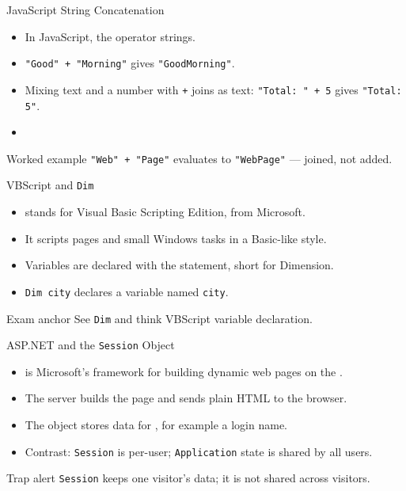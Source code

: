 \documentclass[aspectratio=169]{beamer}
\begin{document}
\begin{frame}{JavaScript String Concatenation}
  \begin{itemize}
    \item In JavaScript, the \key{\texttt{+}} operator 
      strings.
    \item \texttt{"Good" + "Morning"} gives \texttt{"GoodMorning"}.
    \item Mixing text and a number with \texttt{+} joins as text:
      \texttt{"Total: " + 5} gives \texttt{"Total: 5"}.
    \item {}
  \end{itemize}
  \begin{exampleblock}{Worked example}
    \texttt{"Web" + "Page"} evaluates to \texttt{"WebPage"} --- joined, not added.
  \end{exampleblock}
\end{frame}

\begin{frame}{VBScript and \texttt{Dim}}
  \begin{itemize}
    \item {} stands for Visual Basic Scripting Edition, from Microsoft.
    \item It scripts pages and small Windows tasks in a Basic-like style.
    \item Variables are declared with the  statement, short
      for Dimension.
    \item \texttt{Dim city} declares a variable named \texttt{city}.
  \end{itemize}
  \begin{block}{Exam anchor}
    See \texttt{Dim} and think VBScript variable declaration.
  \end{block}
\end{frame}

\begin{frame}{ASP.NET and the \texttt{Session} Object}
  \begin{itemize}
    \item {} is Microsoft's framework for building dynamic web pages
      on the .
    \item The server builds the page and sends plain HTML to the browser.
    \item The  object stores data for , for example a login name.
    \item Contrast: \texttt{Session} is per-user; \texttt{Application} state
      is shared by all users.
  \end{itemize}
  \begin{alertblock}{Trap alert}
    \texttt{Session} keeps one visitor's data; it is not shared across visitors.
  \end{alertblock}
\end{frame}
\end{document}
